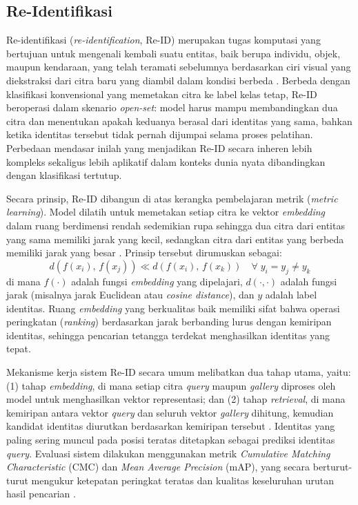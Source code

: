 \subsection{Re-Identifikasi}
Re-identifikasi (\textit{re-identification}, Re-ID) merupakan tugas komputasi yang bertujuan untuk mengenali kembali suatu entitas, baik berupa individu, objek, maupun kendaraan, yang telah teramati sebelumnya berdasarkan ciri visual yang diekstraksi dari citra baru yang diambil dalam kondisi berbeda \cite{zheng2015scalable}. Berbeda dengan klasifikasi konvensional yang memetakan citra ke label kelas tetap, Re-ID beroperasi dalam skenario \textit{open-set}: model harus mampu membandingkan dua citra dan menentukan apakah keduanya berasal dari identitas yang sama, bahkan ketika identitas tersebut tidak pernah dijumpai selama proses pelatihan. Perbedaan mendasar inilah yang menjadikan Re-ID secara inheren lebih kompleks sekaligus lebih aplikatif dalam konteks dunia nyata dibandingkan dengan klasifikasi tertutup.
 
Secara prinsip, Re-ID dibangun di atas kerangka pembelajaran metrik (\textit{metric learning}). Model dilatih untuk memetakan setiap citra ke vektor \textit{embedding} dalam ruang berdimensi rendah sedemikian rupa sehingga dua citra dari entitas yang sama memiliki jarak yang kecil, sedangkan citra dari entitas yang berbeda memiliki jarak yang besar \cite{schroff2015facenet}. Prinsip tersebut dirumuskan sebagai:
\begin{equation}
    d\!\left(f(x_i),\, f(x_j)\right) \ll d\!\left(f(x_i),\, f(x_k)\right)
    \quad \forall\; y_i = y_j \neq y_k
\end{equation}
di mana $f(\cdot)$ adalah fungsi \textit{embedding} yang dipelajari, $d(\cdot,\cdot)$ adalah fungsi jarak (misalnya jarak Euclidean atau \textit{cosine distance}), dan $y$ adalah label identitas. Ruang \textit{embedding} yang berkualitas baik memiliki sifat bahwa operasi peringkatan (\textit{ranking}) berdasarkan jarak berbanding lurus dengan kemiripan identitas, sehingga pencarian tetangga terdekat menghasilkan identitas yang tepat.
 
Mekanisme kerja sistem Re-ID secara umum melibatkan dua tahap utama, yaitu: (1) tahap \textit{embedding}, di mana setiap citra \textit{query} maupun \textit{gallery} diproses oleh model untuk menghasilkan vektor representasi; dan (2) tahap \textit{retrieval}, di mana kemiripan antara vektor \textit{query} dan seluruh vektor \textit{gallery} dihitung, kemudian kandidat identitas diurutkan berdasarkan kemiripan tersebut \cite{zhong2017reranking}. Identitas yang paling sering muncul pada posisi teratas ditetapkan sebagai prediksi identitas \textit{query}. Evaluasi sistem dilakukan menggunakan metrik \textit{Cumulative Matching Characteristic} (CMC) dan \textit{Mean Average Precision} (mAP), yang secara berturut-turut mengukur ketepatan peringkat teratas dan kualitas keseluruhan urutan hasil pencarian \cite{zheng2015scalable}.
 
